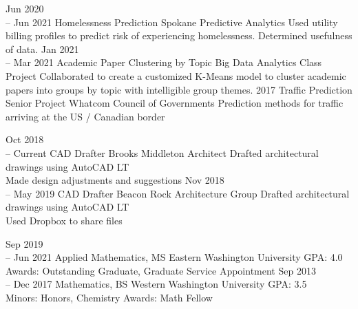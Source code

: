 \documentclass[11pt]{developercv} %
\begin{document}
\vspace{0.5cm}



\begin{entrylist}
	\entry
	    {Jun 2020 \\
		-- Jun 2021}
	    {Homelessness Prediction}
	    {Spokane Predictive Analytics}
	    {Used utility billing profiles to predict risk of experiencing homelessness. Determined usefulness of data.}
	\entry
		{Jan 2021 \\
		-- Mar 2021}
		{Academic Paper Clustering by Topic}
		{Big Data Analytics Class Project}
		{Collaborated to create a customized K-Means model to cluster academic papers into groups by topic with intelligible group themes.}
	\entry
		{2017}
		{Traffic Prediction Senior Project}
		{Whatcom Council of Governments}
		{Prediction methods for traffic arriving at the US / Canadian border}
\end{entrylist}



\begin{entrylist}
	\entry
		{Oct 2018 \\
		-- Current}
		{CAD Drafter}
		{Brooks Middleton Architect}
		{Drafted architectural drawings using AutoCAD LT \\ 
		Made design adjustments and suggestions}
	\entry
		{Nov 2018 \\
		-- May 2019}
		{CAD Drafter}
		{Beacon Rock Architecture Group}
		{Drafted architectural drawings using AutoCAD LT \\ 
		Used Dropbox to share files}
\end{entrylist}



\begin{entrylist}
	\entry
		{Sep 2019\\
		-- Jun 2021}
		{Applied Mathematics, MS}
		{Eastern Washington University}
		{GPA: 4.0 \\
		Awards: Outstanding Graduate, Graduate Service Appointment
		}
	\entry
		{Sep 2013\\
		-- Dec 2017}
		{Mathematics, BS}
		{Western Washington University}
		{GPA: 3.5 \\
		Minors: Honors, Chemistry
		Awards: Math Fellow
		}
\end{entrylist}
\end{document}
